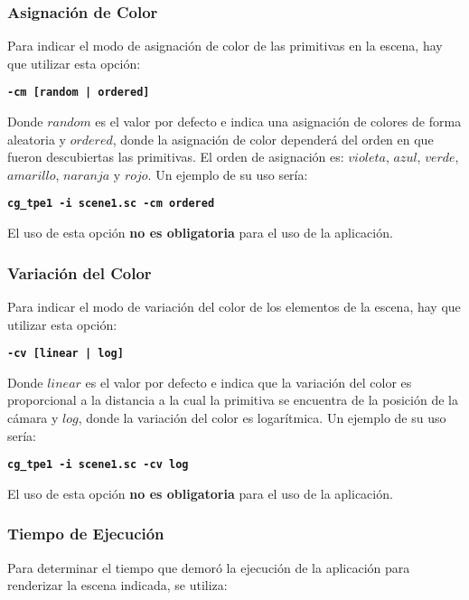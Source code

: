 \documentclass[a4paper,10pt]{article}
\begin{document}
\subsubsection{Asignaci\'on de Color}
Para indicar el modo de asignaci\'on de color de las primitivas en la escena, hay que utilizar esta opci\'on:
\begin{center}
  \textbf{\texttt{-cm [random | ordered]}}
\end{center}

Donde $random$ es el valor por defecto e indica una asignaci\'on de colores de forma aleatoria y $ordered$, donde la asignaci\'on de color depender\'a del orden en que fueron descubiertas las primitivas.  El orden de asignaci\'on es: $violeta$, $azul$, $verde$, $amarillo$, $naranja$ y $rojo$.  Un ejemplo de su uso ser\'ia:
 \begin{center}
 \textbf{\texttt{cg\_tpe1 -i scene1.sc -cm ordered}}
\end{center}

El uso de esta opci\'on \textbf{no es obligatoria} para el uso de la aplicaci\'on.

\subsubsection{Variaci\'on del Color}

Para indicar el modo de variaci\'on del color de los elementos de la escena, hay que utilizar esta opci\'on:

\begin{center}
  \textbf{\texttt{-cv [linear | log]}}
\end{center}

Donde $linear$ es el valor por defecto e indica que la variaci\'on del color es proporcional a la distancia a la cual la primitiva se encuentra de la posici\'on de la c\'amara y $log$, donde la variaci\'on del color es logar\'itmica.  Un ejemplo de su uso ser\'ia:

 \begin{center}
 \textbf{\texttt{cg\_tpe1 -i scene1.sc -cv log}}
\end{center}

El uso de esta opci\'on \textbf{no es obligatoria} para el uso de la aplicaci\'on.

\subsubsection{Tiempo de Ejecuci\'on}

Para determinar el tiempo que demor\'o la ejecuci\'on de la aplicaci\'on para renderizar la escena indicada, se utiliza:
\end{document}
